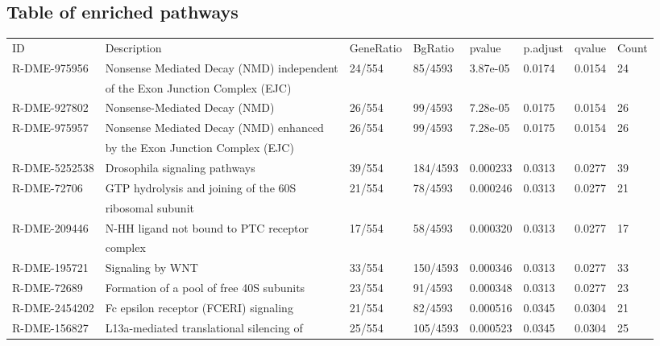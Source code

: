 \documentclass{article}
\begin{document}
\printbibliography

\appendix

\begin{landscape}
\section{Table of enriched pathways}
\label{app:pathways}
\begin{table}[]
\begin{tabular}{llllllll}
ID            & Description                                & GeneRatio & BgRatio  & pvalue   & p.adjust & qvalue & Count \\
R-DME-975956  & Nonsense Mediated Decay (NMD) independent  & 24/554    & 85/4593  & 3.87e-05 & 0.0174   & 0.0154 & 24    \\
							& of the Exon Junction Complex (EJC)         \\
R-DME-927802  & Nonsense-Mediated Decay (NMD)              & 26/554    & 99/4593  & 7.28e-05 & 0.0175   & 0.0154 & 26    \\
R-DME-975957  & Nonsense Mediated Decay (NMD) enhanced     & 26/554    & 99/4593  & 7.28e-05 & 0.0175   & 0.0154 & 26    \\
							& by the Exon Junction Complex (EJC)         \\
R-DME-5252538 & Drosophila signaling pathways              & 39/554    & 184/4593 & 0.000233 & 0.0313   & 0.0277 & 39    \\
R-DME-72706   & GTP hydrolysis and joining of the 60S      & 21/554    & 78/4593  & 0.000246 & 0.0313   & 0.0277 & 21    \\
							& ribosomal subunit													 \\
R-DME-209446  & N-HH ligand not bound to PTC receptor      & 17/554    & 58/4593  & 0.000320 & 0.0313   & 0.0277 & 17    \\
							& complex																		 \\
R-DME-195721  & Signaling by WNT                           & 33/554    & 150/4593 & 0.000346 & 0.0313   & 0.0277 & 33    \\
R-DME-72689   & Formation of a pool of free 40S subunits   & 23/554    & 91/4593  & 0.000348 & 0.0313   & 0.0277 & 23    \\
R-DME-2454202 & Fc epsilon receptor (FCERI) signaling      & 21/554    & 82/4593  & 0.000516 & 0.0345   & 0.0304 & 21    \\
R-DME-156827  & L13a-mediated translational silencing of   & 25/554    & 105/4593 & 0.000523 & 0.0345   & 0.0304 & 25    \\

\end{tabular}
\end{table}
\end{landscape}
\end{document}
